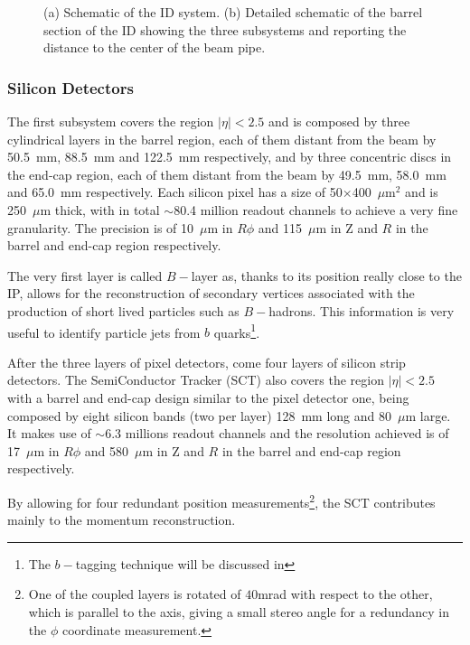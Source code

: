 \begin{figure}[tb]\begin{center}
	\caption{(a) Schematic of the ID system. (b) Detailed schematic of the barrel section of the ID showing the
        three subsystems and reporting the distance to the center of the beam pipe.}
\end{center}\end{figure}


\subsubsection{Silicon Detectors}

The first subsystem covers the region $|\eta|<2.5$ and  is composed by three cylindrical layers in the barrel region, each of them distant from the beam by
50.5~mm, 88.5~mm and 122.5~mm respectively, and by three concentric discs in the end-cap region, each of them distant from the beam by
49.5~mm, 58.0~mm and 65.0~mm respectively.
Each silicon pixel has a size of 50$\times$400~$\mu$m$^{2}$ and is 250~$\mu$m thick, 
with in total $\sim$80.4 million readout channels to achieve a very fine granularity.
The precision is of 10~$\mu$m in $R\phi$ and 115~$\mu$m in Z and $R$ in the barrel and end-cap
region respectively.

The very first layer is called $B-$layer as, thanks to its position really close to the IP,
allows for the reconstruction of secondary vertices associated with the production of
 short lived particles such as $B-$hadrons. This information is very useful to identify
particle jets from $b$ quarks\footnote{The $b-$tagging technique will be discussed in %
}.

After the three layers of pixel detectors, come four layers of  silicon strip detectors. The SemiConductor
Tracker (SCT) also covers the region $|\eta|<2.5$ with a barrel and end-cap design similar to the 
pixel detector one, being composed by eight silicon bands (two per layer) 128~mm long and 80~$\mu$m large.
It makes use of $\sim$6.3 millions readout channels and the resolution achieved is of 17~$\mu$m 
in $R\phi$  and 580~$\mu$m in Z and $R$ in the barrel and end-cap region respectively.

By allowing for four redundant position measurements\footnote{One of the coupled layers is rotated of $40$mrad with respect
to the other, which is parallel to the axis, giving a small stereo angle for a redundancy in the $\phi$ coordinate measurement.}, 
the SCT contributes mainly to the momentum reconstruction.

